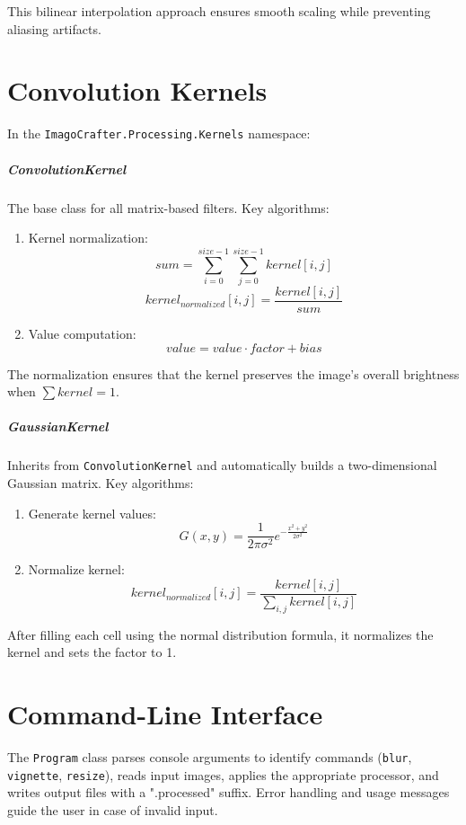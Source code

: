 \documentclass[12pt,a4paper]{report}
\begin{document}
This bilinear interpolation approach ensures smooth scaling while preventing aliasing artifacts.

\chapter{Convolution Kernels}
In the \texttt{ImagoCrafter.Processing.Kernels} namespace:

\paragraph{ConvolutionKernel}
The base class for all matrix-based filters. Key algorithms:
\begin{enumerate}
    \item Kernel normalization:
    \[ sum = \sum_{i=0}^{size-1} \sum_{j=0}^{size-1} kernel[i,j] \]
    \[ kernel_{normalized}[i,j] = \frac{kernel[i,j]}{sum} \]
    
    \item Value computation:
    \[ value = value \cdot factor + bias \]
\end{enumerate}

The normalization ensures that the kernel preserves the image's overall brightness when $\sum kernel = 1$.

\paragraph{GaussianKernel}
Inherits from \texttt{ConvolutionKernel} and automatically builds a two-dimensional Gaussian matrix. Key algorithms:
\begin{enumerate}
    \item Generate kernel values:
    \[ G(x,y) = \frac{1}{2\pi\sigma^2} e^{-\frac{x^2 + y^2}{2\sigma^2}} \]
    
    \item Normalize kernel:
    \[ kernel_{normalized}[i,j] = \frac{kernel[i,j]}{\sum_{i,j} kernel[i,j]} \]
\end{enumerate}

After filling each cell using the normal distribution formula, it normalizes the kernel and sets the factor to 1.

\chapter{Command-Line Interface}
The \texttt{Program} class parses console arguments to identify commands (\texttt{blur}, \texttt{vignette}, \texttt{resize}), reads input images, applies the appropriate processor, and writes output files with a ".processed" suffix. Error handling and usage messages guide the user in case of invalid input.
\end{document}
